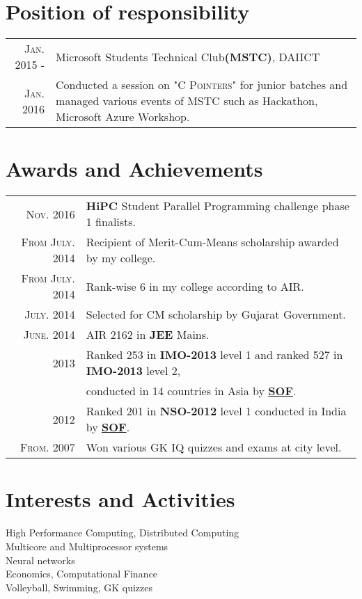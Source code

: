 \documentclass[a4paper,10pt]{article}
\begin{document}
\section{Position of responsibility}
\begin{tabular}{r|p{11cm}}
	\textsc{Jan. 2015 -} & Microsoft Students Technical Club\textbf{(MSTC)}, DAIICT\\
	\textsc{Jan. 2016} &\footnotesize{Conducted a session on \textsc{"C Pointers"} for junior batches and managed various events of MSTC such as Hackathon, Microsoft Azure Workshop.}
\end{tabular}


\section{Awards and Achievements}
\begin{tabular}{rl}
	\textsc{Nov.} 2016 & \textbf{HiPC} Student Parallel Programming challenge phase 1 finalists.\\
	\textsc{From July.} 2014 & Recipient of Merit-Cum-Means scholarship awarded by my college. \\
	\textsc{From July.} 2014 & Rank-wise 6 in my college according to AIR. \\
	\textsc{July.} 2014 & Selected for CM scholarship by Gujarat Government. \\
	\textsc{June.} 2014 & AIR 2162 in \textbf{JEE} Mains. \\
	2013 & Ranked 253 in \textbf{IMO-2013} level 1 and ranked 527 in \textbf{IMO-2013} level 2, \\
	& conducted in 14 countries in Asia by \href{www.sofworld.org}{\textbf{SOF}}.\\
	2012 & Ranked 201 in \textbf{NSO-2012} level 1 conducted in India by \href{www.sofworld.org}{\textbf{SOF}}. \\
	\textsc{From.} 2007 & Won various GK IQ quizzes and exams at city level.
\end{tabular}

\section{Interests and Activities}
High Performance Computing, Distributed Computing \\
Multicore and Multiprocessor systems\\
Neural networks\\
Economics, Computational Finance\\
Volleyball, Swimming, GK quizzes

\thispagestyle{fancy}
\fancyhead{}
\fancyfoot{}
\renewcommand{\headrulewidth}{0pt}
\end{document}
